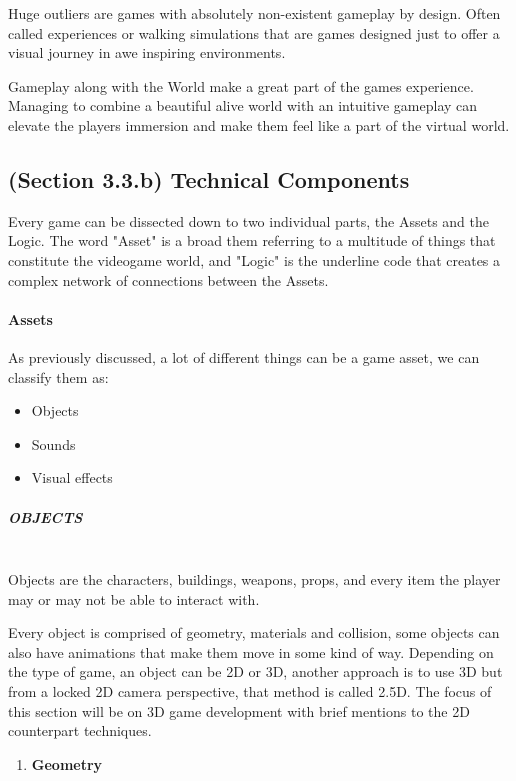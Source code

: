 \documentclass[a4paper,one side,12pt]{book}
\begin{document}
Huge outliers are games with absolutely non-existent gameplay by design.
Often called experiences or walking simulations that are games designed
just to offer a visual journey in awe inspiring environments.

Gameplay along with the World make a great part of the
game\textquotesingle s experience. Managing to combine a beautiful alive
world with an intuitive gameplay can elevate the
players\textquotesingle{} immersion and make them feel like a part of
the virtual world.


\subsection{(Section 3.3.b) Technical Components}

Every game can be dissected down to two individual parts, the Assets and the Logic. The word "Asset" is a broad them referring to a multitude of things that constitute the videogame world, and "Logic" is the underline code that creates a complex network of connections between the Assets.


\paragraph{Assets}

As previously discussed, a lot of different things can be a game asset,
we can classify them as:

\begin{itemize}
\item
  Objects
\item
  Sounds
\item
  Visual effects
\end{itemize}


\subparagraph{OBJECTS\\\\} 

 Objects are the characters, buildings, weapons, props, and every item
the player may or may not be able to interact with.

Every object is comprised of geometry, materials and collision, some
objects can also have animations that make them move in some kind of
way. Depending on the type of game, an object can be 2D or 3D, another
approach is to use 3D but from a locked 2D camera perspective, that
method is called 2.5D. The focus of this section will be on 3D game
development with brief mentions to the 2D counterpart techniques.

\begin{enumerate}
\def\labelenumi{\arabic{enumi}.}
\item
  \textbf{Geometry}
\end{enumerate}
\end{document}
